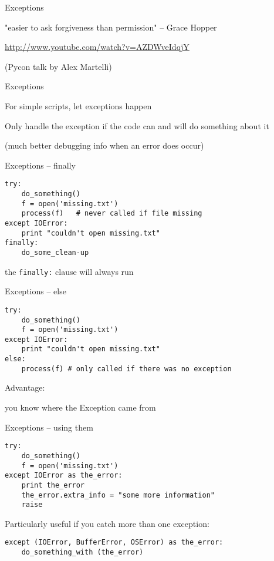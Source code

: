 \documentclass{beamer}
\begin{document}
\begin{frame}[fragile]{Exceptions}

{\centering

{\Large "easier to ask forgiveness than permission"
\vfill
\hfill -- Grace Hopper
}
}

\vfill
\url{http://www.youtube.com/watch?v=AZDWveIdqjY}

(Pycon talk by Alex Martelli)
\end{frame}


\begin{frame}[fragile]{Exceptions}

\vfill
{\Large 
For simple scripts, let exceptions happen\\
\vfill

Only handle the exception if the code can and will do something about it
}
\vfill
(much better debugging info when an error does occur)
\end{frame}


\begin{frame}[fragile]{Exceptions -- finally }

\vfill
\begin{verbatim}
try:
    do_something()
    f = open('missing.txt')
    process(f)   # never called if file missing
except IOError:
    print "couldn't open missing.txt"
finally:
    do_some_clean-up
\end{verbatim}
\vfill
{\Large the \verb|finally:| clause will always run}
\end{frame}

\begin{frame}[fragile]{Exceptions -- else }

\vfill
\begin{verbatim}
try:
    do_something()
    f = open('missing.txt')
except IOError:
    print "couldn't open missing.txt"
else:
    process(f) # only called if there was no exception
\end{verbatim}
\vfill
{\Large Advantage:

you know where the Exception came from}
\end{frame}

\begin{frame}[fragile]{Exceptions -- using them }

\vfill
\begin{verbatim}
try:
    do_something()
    f = open('missing.txt')
except IOError as the_error:
    print the_error
    the_error.extra_info = "some more information"
    raise
\end{verbatim}

{\Large Particularly useful if you catch more than one exception:}

\begin{verbatim}
except (IOError, BufferError, OSError) as the_error:
    do_something_with (the_error)
\end{verbatim}

\end{frame}
\end{document}
